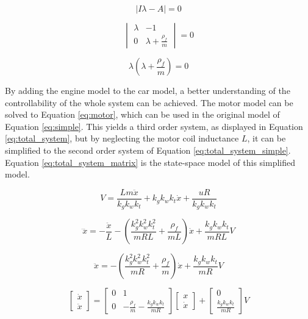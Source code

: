 \documentclass[final]{scrreprt} %
\begin{document}
\begin{equation}
	\left| I \lambda - A \right| = 0
	\label{eq:char_eq}
\end{equation}

\begin{equation}
	\begin{vmatrix}
		\lambda & -1 \\
		0 & \lambda + \frac{\rho_f}{m}
	\end{vmatrix} = 0
	\label{eq:char_eq_matrix}
\end{equation}

\begin{equation}
	\lambda(\lambda + \frac{\rho_f}{m}) = 0
	\label{eq:char_eq_final}
\end{equation}

By adding the engine model to the car model, a better understanding of the controllability of the whole system can be achieved. The motor model can be solved to Equation \ref{eq:motor}, which can be used in the original model of Equation \ref{eq:simple}. This yields a third order system, as displayed in Equation \ref{eq:total_system}, but by neglecting the motor coil inductance $L$, it can be simplified to the second order system of Equation \ref{eq:total_system_simple}. Equation \ref{eq:total_system_matrix} is the state-space model of this simplified model.

\begin{equation}
	V = \frac{Lm\ddot{x}}{k_g k_w k_t} + k_g k_w k_t \dot{x} + \frac{uR}{k_g k_w k_t}
	\label{eq:motor}
\end{equation}

\begin{equation}
	\dddot{x} = -\frac{\ddot{x}}{L} -(\frac{k_g^2 k_w^2 k_t^2}{mRL} + \frac{\rho_f}{mL})\dot{x} + \frac{k_g k_w k_t}{mRL}V
	\label{eq:total_system}
\end{equation}

\begin{equation}
	\ddot{x} = -(\frac{k_g^2 k_w^2 k_t^2}{mR} + \frac{\rho_f}{m})\dot{x} + \frac{k_g k_w k_t}{mR}V
	\label{eq:total_system_simple}
\end{equation}

\begin{equation}
	\begin{bmatrix}
		\dot{x} \\
		\ddot{x}
	\end{bmatrix} =
	\begin{bmatrix}
		0 & 1 \\
		0 & -\frac{\rho_f}{m} - \frac{k_g k_w k_t}{mR}
	\end{bmatrix}
	\begin{bmatrix}
		x \\
		\dot{x}
	\end{bmatrix} +
	\begin{bmatrix}
		0 \\
		\frac{k_g k_w k_t}{mR}
	\end{bmatrix}
	V
	\label{eq:total_system_matrix}
\end{equation}
\end{document}

